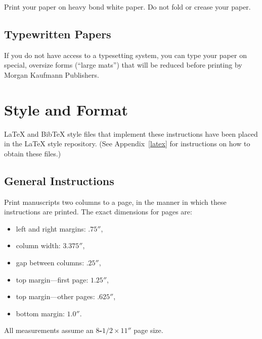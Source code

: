 Print your paper on heavy bond white paper.  Do not fold or crease your paper.

\subsection{Typewritten Papers}

If you do not have access to a typesetting system, you can type your paper
on special, oversize forms (``large mats'') that will be reduced before
printing by Morgan Kaufmann Publishers.  


\section{Style and Format}

\LaTeX{} and Bib\TeX{} style files that implement these instructions have
been placed in the \LaTeX{} style repository.  (See Appendix~\ref{latex} for
instructions on how to obtain these files.)

\subsection{General Instructions}

Print manuscripts two columns to a page, in the manner in which these
instructions are printed.  The exact dimensions for pages are:
\begin{itemize}
\item left and right margins: $.75''$,
\item column width: $3.375''$,
\item gap between columns: $.25''$,
\item top margin---first page: $1.25''$,
\item top margin---other pages: $.625''$,
\item bottom margin: $1.0''$.
\end{itemize}
All measurements assume an {\bf $8$-$1/2 \times 11''$} page size.

